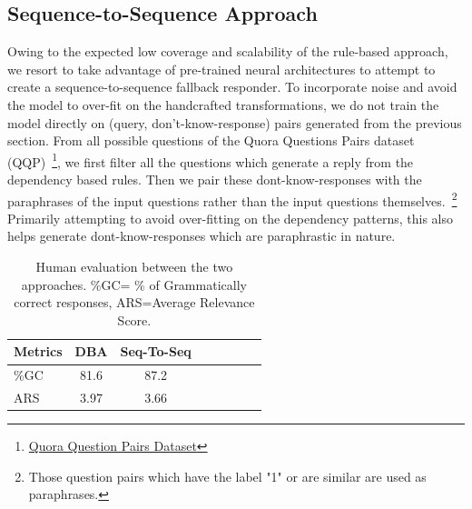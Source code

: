 \documentclass[11pt,a4paper]{article}
\begin{document}
\subsection{Sequence-to-Sequence Approach}
Owing to the expected low coverage and scalability of the rule-based approach, we resort to take advantage of pre-trained neural architectures to attempt to create a sequence-to-sequence fallback responder. To incorporate noise and avoid the model to over-fit on the handcrafted transformations, we do not train the model directly on (query, don't-know-response) pairs generated from the previous section. From all possible questions of the Quora Questions Pairs dataset (QQP)~\footnote{\href{https://www.quora.com/q/quoradata/First-Quora-Dataset-Release-Question-Pairs}{Quora Question Pairs Dataset}}, we first filter all the questions which generate a reply from the dependency based rules. Then we pair these dont-know-responses with the paraphrases of the input questions rather than the input questions themselves.~\footnote{Those question pairs which have the label "1" or are similar are used as paraphrases.} Primarily attempting to avoid over-fitting on the dependency patterns, this also helps generate dont-know-responses which are paraphrastic in nature.

\begin{table}[ht!]
\small
\centering
\begin{tabularx}{0.785\columnwidth}{|l*{3}{c}|l*{3}{c}}%
\hline
\hspace{0.25cm}\textbf{Metrics} &
\hspace{0.25cm}\textbf{DBA} &
\hspace{0.25cm}\textbf{Seq-To-Seq} &\\
\hline
\hspace{0.35cm}\%GC &
\hspace{0.2cm}81.6  &
\hspace{0.2cm}87.2 & \\
\hspace{0.4cm}ARS &
\hspace{0.2cm}3.97 &
\hspace{0.2cm}3.66 & \\
\hline
\end{tabularx}
\caption{Human evaluation between the two approaches. \%GC= \% of Grammatically correct responses, ARS=Average Relevance Score. 
  }
\label{human_evaluation-table}
\end{table}
\end{document}

